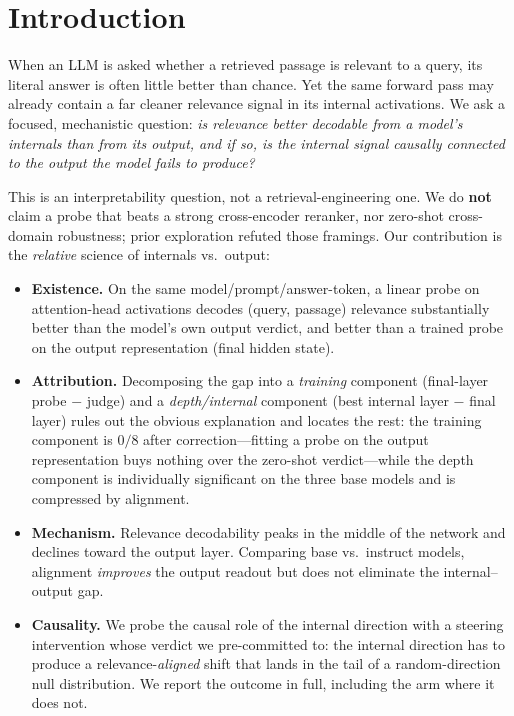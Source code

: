 \documentclass[11pt]{article}
\begin{document}
\section{Introduction}
When an LLM is asked whether a retrieved passage is relevant to a query, its
literal answer is often little better than chance. Yet the same forward pass
may already contain a far cleaner relevance signal in its internal
activations. We ask a focused, mechanistic question: \emph{is relevance
better decodable from a model's internals than from its output, and if so,
is the internal signal causally connected to the output the model fails to
produce?}

This is an interpretability question, not a retrieval-engineering one. We do
\textbf{not} claim a probe that beats a strong cross-encoder reranker, nor
zero-shot cross-domain robustness; prior exploration refuted those framings.
Our contribution is the \emph{relative} science of internals vs.\ output:

\begin{itemize}
  \item \textbf{Existence.} On the same model/prompt/answer-token, a linear
  probe on attention-head activations decodes (query, passage) relevance
  substantially better than the model's own output verdict, and better than a
  trained probe on the output representation (final hidden state).
  \item \textbf{Attribution.} Decomposing the gap into a
  \emph{training} component (final-layer probe $-$ judge) and a
  \emph{depth/internal} component (best internal layer $-$ final layer) rules
  out the obvious explanation and locates the rest: the training component is
  $0/8$ after correction---fitting a probe on the output representation buys
  nothing over the zero-shot verdict---while the depth component is
  individually significant on the three base models and is compressed by
  alignment.
  \item \textbf{Mechanism.} Relevance decodability peaks in the middle of the
  network and declines toward the output layer. Comparing base vs.\ instruct
  models, alignment \emph{improves} the output readout but does not eliminate
  the internal--output gap.
  \item \textbf{Causality.} We probe the causal role of the internal direction
  with a steering intervention whose verdict we pre-committed to: the internal
  direction has to produce a relevance-\emph{aligned} shift that lands in the
  tail of a random-direction null distribution. We report the outcome in full,
  including the arm where it does not.
\end{itemize}
\end{document}
